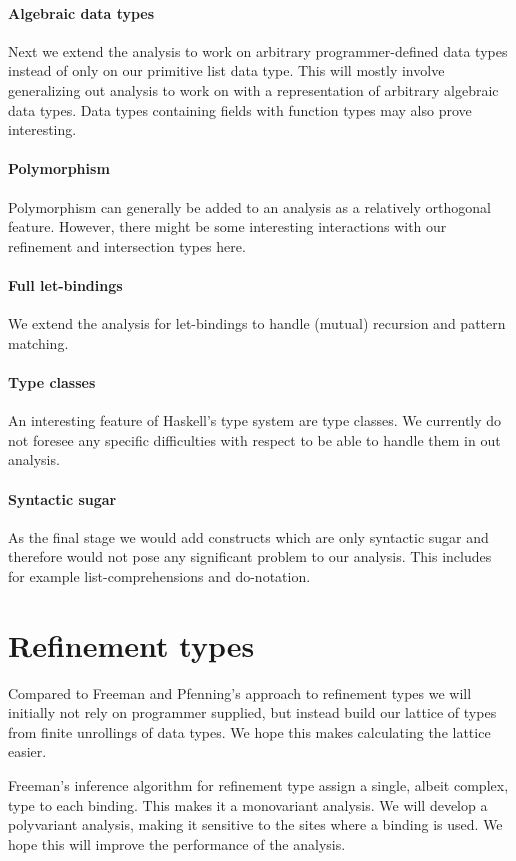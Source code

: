 \documentclass[a4paper]{report}
\begin{document}
\paragraph{Algebraic data types} Next we extend the analysis to work on arbitrary programmer-defined data types instead of only on our primitive list data type. This will mostly involve generalizing out analysis to work on with a representation of arbitrary algebraic data types. Data types containing fields with function types may also prove interesting.
\paragraph{Polymorphism} Polymorphism can generally be added to an analysis as a relatively orthogonal feature. However, there might be some interesting interactions with our refinement and intersection types here.
\paragraph{Full let-bindings} We extend the analysis for let-bindings to handle (mutual) recursion and pattern matching.
\paragraph{Type classes} An interesting feature of Haskell's type system are type classes. We currently do not foresee any specific difficulties with respect to be able to handle them in out analysis.
\paragraph{Syntactic sugar} As the final stage we would add constructs which are only syntactic sugar and therefore would not pose any significant problem to our analysis. This includes for example list-comprehensions and do-notation.

\section{Refinement types}

Compared to Freeman and Pfenning's approach to refinement types we will initially not rely on programmer supplied, but instead build our lattice of types from finite unrollings of data types. We hope this makes calculating the lattice easier.

Freeman's inference algorithm for refinement type assign a single, albeit complex, type to each binding. This makes it a monovariant analysis. We will develop a polyvariant analysis, making it sensitive to the sites where a binding is used. We hope this will improve the performance of the analysis.
\end{document}
